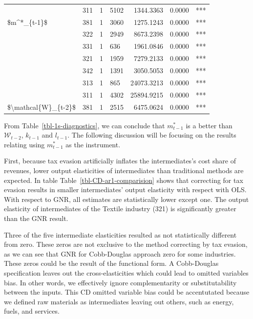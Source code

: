 \documentclass[
  12pt]{article}
\theoremstyle{definition}
\theoremstyle{remark}
\begin{document}
\begin{table}
{\begin{tabular}[t]{l|l|l|l|r|r|l}
\cline{2-7}
 & 311 & 1 & 5102 & 1344.3363 & 0.0000 & ***\\
\cline{2-7}
\multirow[t]{-7}{*}{\raggedright\arraybackslash \$m\textasciicircum{}*\_\{t-1\}\$} & 381 & 1 & 3060 & 1275.1243 & 0.0000 & ***\\
\cline{1-7}
 & 322 & 1 & 2949 & 8673.2398 & 0.0000 & ***\\
\cline{2-7}
 & 331 & 1 & 636 & 1961.0846 & 0.0000 & ***\\
\cline{2-7}
 & 321 & 1 & 1959 & 7279.2133 & 0.0000 & ***\\
\cline{2-7}
 & 342 & 1 & 1391 & 3050.5053 & 0.0000 & ***\\
\cline{2-7}
 & 313 & 1 & 865 & 24073.3213 & 0.0000 & ***\\
\cline{2-7}
 & 311 & 1 & 4302 & 25894.9215 & 0.0000 & ***\\
\cline{2-7}
\multirow[t]{-7}{*}{\raggedright\arraybackslash \$\textbackslash{}mathcal\{W\}\_\{t-2\}\$} & 381 & 1 & 2515 & 6475.0624 & 0.0000 & ***\\
\hline
\end{tabular}

}

\end{table}%

From Table~\ref{tbl-1s-diagnostics}, we can conclude that \(m^*_{t-1}\)
is a better than \(\mathcal{W}_{t-2}\), \(k_{t-1}\) and \(l_{t-1}\). The
following discussion will be focusing on the results relating using
\(m^*_{t-1}\) as the instrument.

First, because tax evasion artificially inflates the intermediates's
cost share of revenues, lower output elasticities of intermediates than
traditional methods are expected. In table
Table~\ref{tbl-CD-ar1-comparision} shows that correcting for tax evasion
results in smaller intermediates' output elasticity with respect with
OLS. With respect to GNR, all estimates are statistically lower except
one. The output elasticity of intermediates of the Textile industry
(321) is significantly greater than the GNR result.

Three of the five intermediate elasticities resulted as not
statistically different from zero. These zeros are not exclusive to the
method correcting by tax evasion, as we can see that GNR for
Cobb-Douglas approach zero for some industries. These zeros could be the
result of the functional form. A Cobb-Douglas specification leaves out
the cross-elasticities which could lead to omitted variables bias. In
other words, we effectively ignore complementarity or substitutability
between the inputs. This CD omitted variable bias could be accentutated
because we defined raw materials as intermediates leaving out others,
such as energy, fuels, and services.
\end{document}
